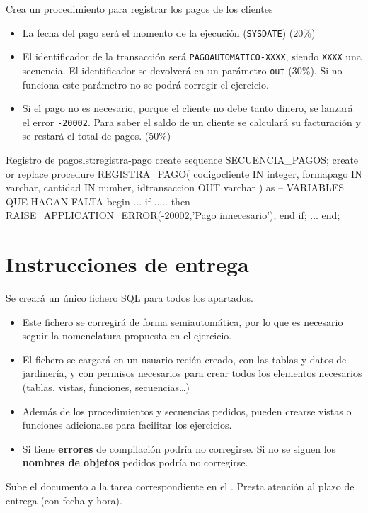 \begin{homeworkProblem}

  Crea un procedimiento para registrar los pagos de los clientes
  \begin{itemize}
  \item La fecha del pago será el momento de la ejecución (\texttt{SYSDATE}) (20\%)
  \item El identificador de la transacción será \texttt{PAGOAUTOMATICO-XXXX}, siendo \texttt{XXXX} una secuencia. El identificador se devolverá en un parámetro \texttt{out} (30\%). Si no funciona este parámetro no se podrá corregir el ejercicio.
  \item Si el pago no es necesario, porque el cliente no debe tanto dinero, se lanzará el error \texttt{-20002}. Para saber el saldo de un cliente se calculará su facturación y se restará el total de pagos. (50\%)
  \end{itemize}

\begin{listadosql}{Registro de pagos}{lst:registra-pago}
create sequence SECUENCIA_PAGOS;
create or replace procedure REGISTRA_PAGO(
  codigocliente IN integer,
  formapago IN varchar,
  cantidad IN number,
  idtransaccion OUT varchar
)
as
  -- VARIABLES QUE HAGAN FALTA
begin
  ...
  if ..... then
    RAISE_APPLICATION_ERROR(-20002,'Pago innecesario');
  end if;
  ...
end; 
  \end{listadosql}


  
\end{homeworkProblem}

\section{Instrucciones de entrega}
Se creará un único fichero SQL para todos los apartados.
\begin{itemize}
\item Este fichero se corregirá de forma semiautomática, por lo que es necesario seguir la nomenclatura propuesta en el ejercicio.
\item El fichero se cargará en un usuario recién creado, con las tablas y datos de jardinería, y con permisos necesarios para crear todos los elementos necesarios (tablas, vistas, funciones, secuencias\dots)
\item Además de los procedimientos y secuencias pedidos, pueden crearse vistas o funciones adicionales para facilitar los ejercicios.
\item Si tiene \textbf{errores} de compilación podría no corregirse. Si no se siguen los \textbf{nombres de objetos} pedidos podría no corregirse.
\end{itemize}


Sube el documento a la tarea correspondiente en el .
Presta atención al plazo de entrega (con fecha y hora).







